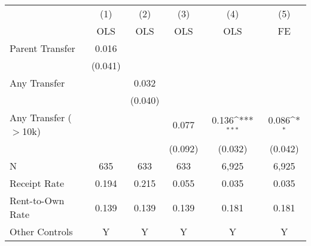 {
\def\sym#1{\ifmmode^{#1}\else\(^{#1}\)\fi}
\begin{tabular}{l*{5}{c}}
\toprule
                &\multicolumn{1}{c}{(1)}&\multicolumn{1}{c}{(2)}&\multicolumn{1}{c}{(3)}&\multicolumn{1}{c}{(4)}&\multicolumn{1}{c}{(5)}\\
                &\multicolumn{1}{c}{OLS}&\multicolumn{1}{c}{OLS}&\multicolumn{1}{c}{OLS}&\multicolumn{1}{c}{OLS}&\multicolumn{1}{c}{FE}\\
\midrule
\;Parent Transfer&    0.016         &                  &                  &                  &                  \\
                &  (0.041)         &                  &                  &                  &                  \\
\;Any Transfer  &                  &    0.032         &                  &                  &                  \\
                &                  &  (0.040)         &                  &                  &                  \\
\;Any Transfer ($>$10k)&                  &                  &    0.077         &    0.136\sym{***}&    0.086\sym{*}  \\
                &                  &                  &  (0.092)         &  (0.032)         &  (0.042)         \\
\midrule
N               &      635         &      633         &      633         &    6,925         &    6,925         \\
Receipt Rate    &    0.194         &    0.215         &    0.055         &    0.035         &    0.035         \\
Rent-to-Own Rate&    0.139         &    0.139         &    0.139         &    0.181         &    0.181         \\
Other Controls  &        Y         &        Y         &        Y         &        Y         &        Y         \\
\bottomrule
\end{tabular}
}
